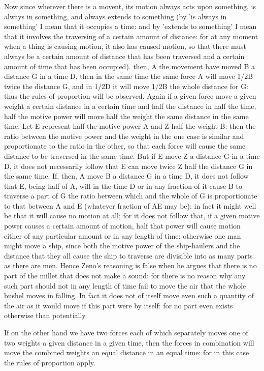 Now since wherever there is a movent, its motion always acts upon
something, is always in something, and always extends to something
(by 'is always in something' I mean that it occupies a time: and by
'extends to something' I mean that it involves the traversing of a
certain amount of distance: for at any moment when a thing is causing
motion, it also has caused motion, so that there must always be a
certain amount of distance that has been traversed and a certain amount
of time that has been occupied). then, A the movement have moved B
a distance G in a time D, then in the same time the same force A will
move 1/2B twice the distance G, and in 1/2D it will move 1/2B the
whole distance for G: thus the rules of proportion will be observed.
Again if a given force move a given weight a certain distance in a
certain time and half the distance in half the time, half the motive
power will move half the weight the same distance in the same time.
Let E represent half the motive power A and Z half the weight B: then
the ratio between the motive power and the weight in the one case
is similar and proportionate to the ratio in the other, so that each
force will cause the same distance to be traversed in the same time.
But if E move Z a distance G in a time D, it does not necessarily
follow that E can move twice Z half the distance G in the same time.
If, then, A move B a distance G in a time D, it does not follow that
E, being half of A, will in the time D or in any fraction of it cause
B to traverse a part of G the ratio between which and the whole of
G is proportionate to that between A and E (whatever fraction of AE
may be): in fact it might well be that it will cause no motion at
all; for it does not follow that, if a given motive power causes a
certain amount of motion, half that power will cause motion either
of any particular amount or in any length of time: otherwise one man
might move a ship, since both the motive power of the ship-haulers
and the distance that they all cause the ship to traverse are divisible
into as many parts as there are men. Hence Zeno's reasoning is false
when he argues that there is no part of the millet that does not make
a sound: for there is no reason why any such part should not in any
length of time fail to move the air that the whole bushel moves in
falling. In fact it does not of itself move even such a quantity of
the air as it would move if this part were by itself: for no part
even exists otherwise than potentially. 

If on the other hand we have two forces each of which separately moves
one of two weights a given distance in a given time, then the forces
in combination will move the combined weights an equal distance in
an equal time: for in this case the rules of proportion apply.

